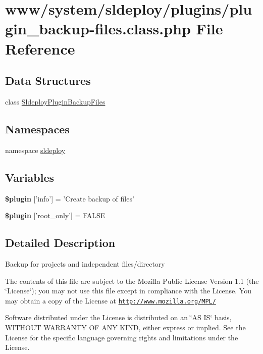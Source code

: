 \hypertarget{plugin__backup-files_8class_8php}{
\section{www/system/sldeploy/plugins/plugin\_\-backup-\/files.class.php File Reference}
\label{plugin__backup-files_8class_8php}
}
\subsection*{Data Structures}
\begin{DoxyCompactItemize}
\item 
class \hyperlink{class_sldeploy_plugin_backup_files}{SldeployPluginBackupFiles}
\end{DoxyCompactItemize}
\subsection*{Namespaces}
\begin{DoxyCompactItemize}
\item 
namespace \hyperlink{namespacesldeploy}{sldeploy}
\end{DoxyCompactItemize}
\subsection*{Variables}
\begin{DoxyCompactItemize}
\item 
\hypertarget{plugin__backup-files_8class_8php_a95edf69ebbeaeedb03bab3bb010f2af9}{
{\bfseries \$plugin} \mbox{[}'info'\mbox{]} = 'Create backup of files'}
\label{plugin__backup-files_8class_8php_a95edf69ebbeaeedb03bab3bb010f2af9}

\item 
\hypertarget{plugin__backup-files_8class_8php_a1d302084fa15e3efe6c843cbb5096985}{
{\bfseries \$plugin} \mbox{[}'root\_\-only'\mbox{]} = FALSE}
\label{plugin__backup-files_8class_8php_a1d302084fa15e3efe6c843cbb5096985}

\end{DoxyCompactItemize}


\subsection{Detailed Description}
Backup for projects and independent files/directory

The contents of this file are subject to the Mozilla Public License Version 1.1 (the \char`\"{}License\char`\"{}); you may not use this file except in compliance with the License. You may obtain a copy of the License at \href{http://www.mozilla.org/MPL/}{\tt http://www.mozilla.org/MPL/}

Software distributed under the License is distributed on an \char`\"{}AS IS\char`\"{} basis, WITHOUT WARRANTY OF ANY KIND, either express or implied. See the License for the specific language governing rights and limitations under the License. 